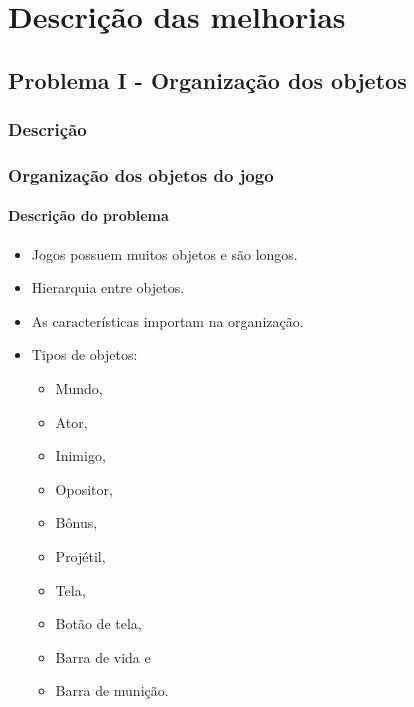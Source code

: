 \documentclass[]{beamer}
\begin{document}
   \section{Descrição das melhorias}
   \subsection{Problema I - Organização dos objetos}
   \subsubsection{Descrição}
   \begin{frame}
      \frametitle{Organização dos objetos do jogo}
      \framesubtitle{Descrição do problema}
      \begin{itemize}
         \item Jogos possuem muitos objetos e são longos.
         \item Hierarquia entre objetos.
         \item As características importam na organização.
         \item Tipos de objetos:
            \begin{multicols}{2}
               \begin{itemize}
                  \item Mundo,
                  \item Ator,
                  \item Inimigo,
                  \item Opositor,
                  \item Bônus,
                  \item Projétil,
                  \item Tela,
                  \item Botão de tela,
                  \item Barra de vida e
                  \item Barra de munição.
               \end{itemize}
            \end{multicols}
      \end{itemize}
   \end{frame}
\end{document}
